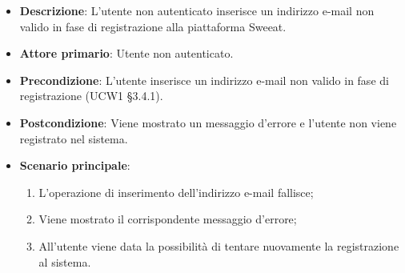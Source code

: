 \begin{itemize}
\item \textbf{Descrizione}: L'utente non autenticato inserisce un indirizzo e-mail non valido in fase di registrazione alla piattaforma Sweeat.
\item \textbf{Attore primario}: Utente non autenticato.
\item \textbf{Precondizione}: L'utente inserisce un indirizzo e-mail non valido in fase di registrazione (UCW1 §3.4.1).
\item \textbf{Postcondizione}: Viene mostrato un messaggio d'errore e l'utente non viene registrato nel sistema.

\item \textbf{Scenario principale}:
\begin{enumerate}
\item L'operazione di inserimento dell'indirizzo e-mail fallisce;
\item Viene mostrato il corrispondente messaggio d'errore;
\item All'utente viene data la possibilità di tentare nuovamente la registrazione al sistema.
\end{enumerate}
\end{itemize}